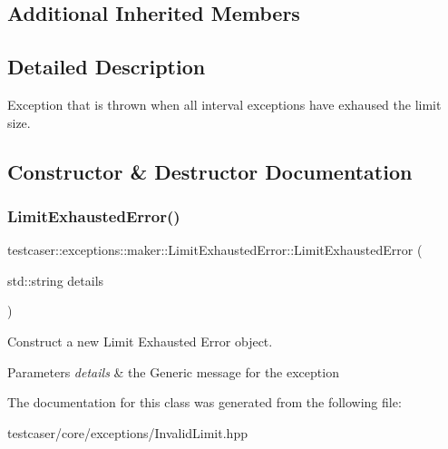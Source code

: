 \subsection*{Additional Inherited Members}


\subsection{Detailed Description}
Exception that is thrown when all interval exceptions have exhaused the limit size. 

\subsection{Constructor \& Destructor Documentation}
\mbox{\label{classtestcaser_1_1exceptions_1_1maker_1_1LimitExhaustedError_a9ba2ad6f34755e1039132a7fa763e55f}} 
\subsubsection{\texorpdfstring{Limit\+Exhausted\+Error()}{LimitExhaustedError()}}
{\footnotesize\ttfamily testcaser\+::exceptions\+::maker\+::\+Limit\+Exhausted\+Error\+::\+Limit\+Exhausted\+Error (\begin{DoxyParamCaption}\item[{std\+::string}]{details }\end{DoxyParamCaption})\hspace{0.3cm}{\ttfamily [inline]}}



Construct a new Limit Exhausted Error object. 


\begin{DoxyParams}{Parameters}
{\em details} & the Generic message for the exception \\
\hline
\end{DoxyParams}


The documentation for this class was generated from the following file\+:\begin{DoxyCompactItemize}
\item 
testcaser/core/exceptions/Invalid\+Limit.\+hpp\end{DoxyCompactItemize}
